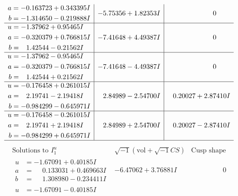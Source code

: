 \documentclass[1p]{elsarticle_modified}
\theoremstyle{definition}
\newcommand{\I}{\sqrt{-1}}
\begin{document}
$$\begin{array}{c|c|c}
\begin{aligned}
a &= -0.163723 + 0.343395 I \\
b &= -1.314650 - 0.219888 I\end{aligned}
 & -5.75356 + 1.82353 I & \phantom{-0.000000 } 0 \\ \hline\begin{aligned}
u &= -1.37962 + 0.95465 I \\
a &= -0.320379 + 0.766815 I \\
b &= \phantom{-}1.42544 - 0.21562 I\end{aligned}
 & -7.41648 + 4.49387 I & \phantom{-0.000000 } 0 \\ \hline\begin{aligned}
u &= -1.37962 - 0.95465 I \\
a &= -0.320379 - 0.766815 I \\
b &= \phantom{-}1.42544 + 0.21562 I\end{aligned}
 & -7.41648 - 4.49387 I & \phantom{-0.000000 } 0 \\ \hline\begin{aligned}
u &= -0.176458 + 0.261015 I \\
a &= \phantom{-}2.19741 - 2.19418 I \\
b &= -0.984299 - 0.645971 I\end{aligned}
 & \phantom{-}2.84989 - 2.54700 I & \phantom{-}0.20027 + 2.87410 I \\ \hline\begin{aligned}
u &= -0.176458 - 0.261015 I \\
a &= \phantom{-}2.19741 + 2.19418 I \\
b &= -0.984299 + 0.645971 I\end{aligned}
 & \phantom{-}2.84989 + 2.54700 I & \phantom{-}0.20027 - 2.87410 I\\
 \hline 
 \end{array}$$\newpage$$\begin{array}{c|c|c}  
\text{Solutions to }I^u_{1}& \I (\text{vol} + \sqrt{-1}CS) & \text{Cusp shape}\\
 \hline 
\begin{aligned}
u &= -1.67091 + 0.40185 I \\
a &= \phantom{-}0.133031 + 0.469663 I \\
b &= \phantom{-}1.308980 - 0.234411 I\end{aligned}
 & -6.47062 + 3.76881 I & \phantom{-0.000000 } 0 \\ \hline\begin{aligned}
u &= -1.67091 - 0.40185 I \\

\end{aligned}
\end{array}$$
\end{document}
